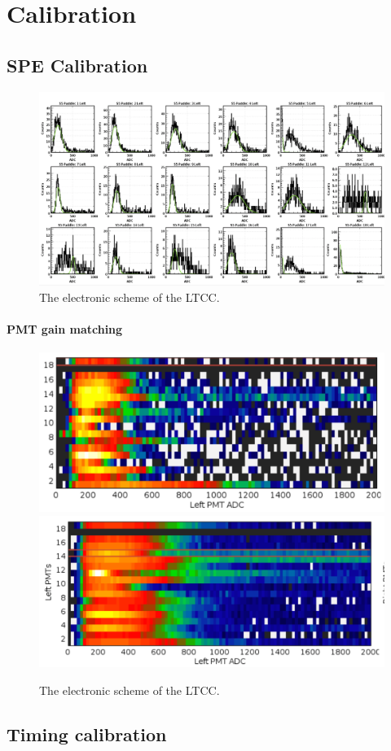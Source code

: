 \section{Calibration}

\subsection{SPE Calibration}

\begin{figure}
	\centering
	\includegraphics[width=0.95\columnwidth,keepaspectratio]{img/spe.png}
	\caption{The electronic scheme of the LTCC.}
	\label{fig:gainMatching}
\end{figure}


\paragraph{PMT gain matching}


\begin{figure}
	\centering
	\includegraphics[width=0.95\columnwidth,keepaspectratio]{img/gainMatchingBefore.png}
	\includegraphics[width=0.95\columnwidth,keepaspectratio]{img/gainMatchingAfter.png}
	\caption{The electronic scheme of the LTCC.}
	\label{fig:gainMatching}
\end{figure}

\subsection{Timing calibration}



